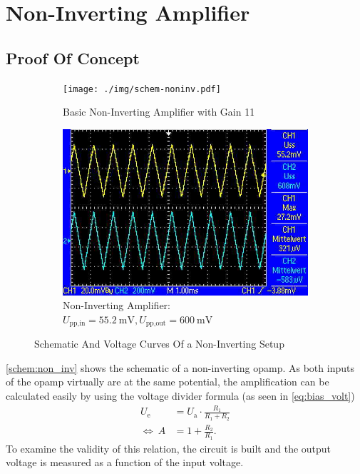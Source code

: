 \chapter{Non-Inverting Amplifier}
\section{Proof Of Concept}
\begin{figure}[tbp]
	\centering
	\begin{subfigure}{0.4\textwidth}
		\centering
		\texttt{[image: ./img/schem-noninv.pdf]}
		\caption{Basic Non-Inverting Amplifier with Gain 11}
		\label{schem:non_inv}
	\end{subfigure}
	\begin{subfigure}{0.4\textwidth}
		\centering
		\includegraphics[width=.9\linewidth]{./img/non-inv-curve.jpg}
		\caption{Non-Inverting Amplifier:\newline $U_\text{pp,in}=\SI{55.2}{\milli\volt}, U_\text{pp,out}=\SI{600}{\milli\volt}$}
		\label{subfig:non_inv_curve}
	\end{subfigure}
	\caption{Schematic And Voltage Curves Of a Non-Inverting Setup}
\end{figure}
\autoref{schem:non_inv} shows the schematic of a non-inverting opamp.
As both inputs of the opamp virtually are at the same potential, the amplification can be calculated easily by using the voltage divider formula (as seen in \autoref{eq:bias_volt})
\begin{align*}
	U_\text{e}&=U_\text{a}\cdot\frac{R_1}{R_1+R_2} \\
	\Leftrightarrow\ A &=1+\frac{R_2}{R_1}.
\end{align*}
To examine the validity of this relation, the circuit is built and the output voltage is measured as a function of the input voltage.
